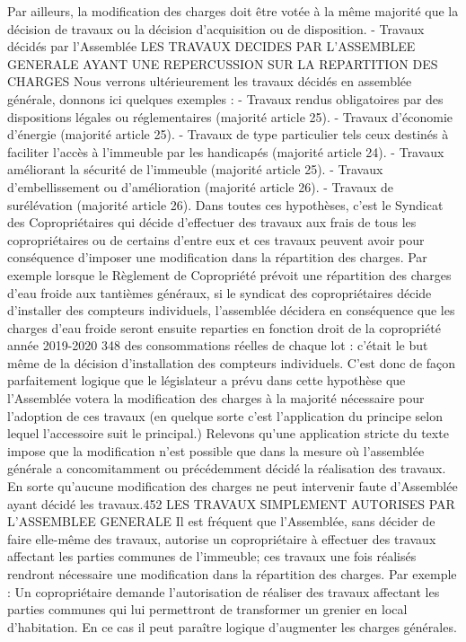 Par ailleurs, la modification des charges doit être votée à la même majorité que la décision de travaux ou la décision d’acquisition ou de disposition.
- Travaux décidés par l'Assemblée
LES TRAVAUX DECIDES PAR L’ASSEMBLEE GENERALE AYANT UNE REPERCUSSION SUR LA REPARTITION DES CHARGES
Nous verrons ultérieurement les travaux décidés en assemblée générale, donnons ici quelques exemples :
- Travaux rendus obligatoires par des dispositions légales ou réglementaires (majorité article 25).
- Travaux d'économie d'énergie (majorité article 25).
- Travaux de type particulier tels ceux destinés à faciliter l'accès à l'immeuble par les handicapés (majorité article 24).
- Travaux améliorant la sécurité de l'immeuble (majorité article 25).
- Travaux d'embellissement ou d'amélioration (majorité article 26).
- Travaux de surélévation (majorité article 26).
Dans toutes ces hypothèses, c'est le Syndicat des Copropriétaires qui décide d'effectuer des travaux aux frais de tous les copropriétaires ou de certains d'entre eux et ces travaux peuvent avoir pour conséquence d'imposer une modification dans la répartition des charges.
Par exemple lorsque le Règlement de Copropriété prévoit une répartition des charges d'eau froide aux tantièmes généraux, si le syndicat des copropriétaires décide d'installer des compteurs individuels, l'assemblée décidera en conséquence que les charges d'eau froide seront ensuite reparties en fonction
droit de la copropriété année 2019-2020
348
des consommations réelles de chaque lot : c'était le but même de la décision d'installation des compteurs individuels.
C'est donc de façon parfaitement logique que le législateur a prévu dans cette hypothèse que l'Assemblée votera la modification des charges à la majorité nécessaire pour l'adoption de ces travaux (en quelque sorte c'est l'application du principe selon lequel l'accessoire suit le principal.)
Relevons qu’une application stricte du texte impose que la modification n’est possible que dans la mesure où l’assemblée générale a concomitamment ou précédemment décidé la réalisation des travaux. En sorte qu’aucune modification des charges ne peut intervenir faute d’Assemblée ayant décidé les travaux.452
LES TRAVAUX SIMPLEMENT AUTORISES PAR L’ASSEMBLEE GENERALE
Il est fréquent que l'Assemblée, sans décider de faire elle-même des travaux, autorise un copropriétaire à effectuer des travaux affectant les parties communes de l'immeuble; ces travaux une fois réalisés rendront nécessaire une modification dans la répartition des charges.
Par exemple :
Un copropriétaire demande l'autorisation de réaliser des travaux affectant les parties communes qui lui permettront de transformer un grenier en local d'habitation. En ce cas il peut paraître logique d'augmenter les charges générales.
